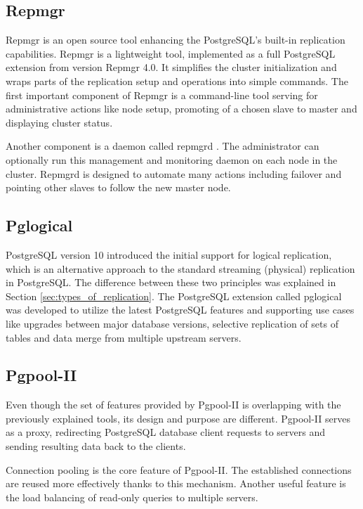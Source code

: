 \documentclass[
  digital, %
  twoside, %
  table,   %
  nolof,   %
  nolot,   %
]{fithesis3}
\begin{document}
\subsection{Repmgr} \label{sec:repmgr}
Repmgr \cite{repmgr} is an open source tool enhancing the PostgreSQL's built-in replication capabilities. Repmgr is a lightweight tool, implemented as a full PostgreSQL extension from version Repmgr 4.0. It simplifies the cluster initialization and wraps parts of the replication setup and operations into simple commands.
The first important component of Repmgr is a command-line tool serving for administrative actions like node setup, promoting of a chosen slave to master and displaying cluster status.

Another component is a daemon called repmgrd \cite{repmgrd}. The administrator can optionally run this management and monitoring daemon on each node in the cluster. Repmgrd is designed to automate many actions including failover and pointing other slaves to follow the new master node.

\subsection{Pglogical}
PostgreSQL version 10 introduced the initial support for logical replication, which is an alternative approach to the standard streaming (physical) replication in PostgreSQL. The difference between these two principles was explained in Section \ref{sec:types_of_replication}. The PostgreSQL extension called pglogical \cite{pglogical} was developed to utilize the latest PostgreSQL features and supporting use cases like upgrades between major database versions, selective replication of sets of tables and data merge from multiple upstream servers.

\subsection{Pgpool-II} \label{sec:pgpool}
Even though the set of features provided by Pgpool-II \cite{pgpool} is overlapping with the previously explained tools, its design and purpose are different. Pgpool-II serves as a proxy, redirecting PostgreSQL database client requests to servers and sending resulting data back to the clients.

Connection pooling is the core feature of Pgpool-II. The established connections are reused more effectively thanks to this mechanism. Another useful feature is the load balancing of read-only queries to multiple servers.
\end{document}

